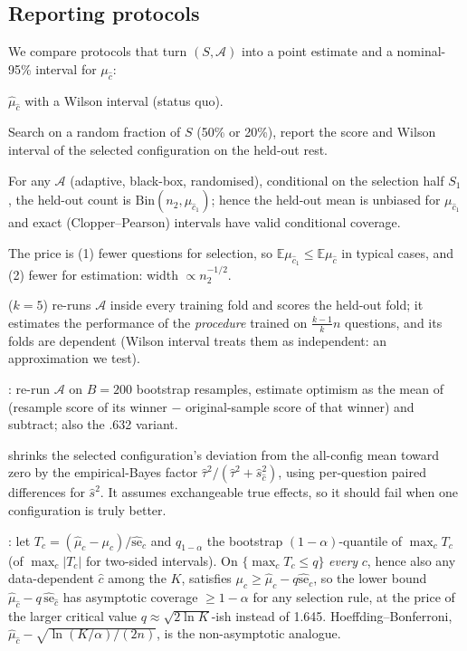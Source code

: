 \subsection{Reporting protocols}\label{sec:protocols}
We compare protocols that turn $(S,\mathcal A)$ into a point estimate and a nominal-95\% interval for $\mu_{\hat c}$:
\begin{description}[leftmargin=1.2em,itemsep=0pt,topsep=2pt]
\item[Naive] $\hat\mu_{\hat c}$ with a Wilson interval (status quo).
\item[Split ($\rho_{\rm sel}$)] Search on a random fraction of $S$ (50\% or 20\%), report the score and Wilson interval of the selected configuration on the held-out rest.
\begin{proposition}\label{prop:split}For any $\mathcal A$ (adaptive, black-box, randomised), conditional on the selection half $S_1$, the held-out count is $\mathrm{Bin}(n_2,\mu_{\hat c_1})$; hence the held-out mean is unbiased for $\mu_{\hat c_1}$ and exact (Clopper--Pearson) intervals have valid conditional coverage.\end{proposition}
The price is (1) fewer questions for selection, so $\mathbb E\mu_{\hat c_1}\le\mathbb E\mu_{\hat c}$ in typical cases, and (2) fewer for estimation: width $\propto n_2^{-1/2}$.
\item[Nested $k$-fold CV] ($k=5$) re-runs $\mathcal A$ inside every training fold and scores the held-out fold; it estimates the performance of the \emph{procedure} trained on $\tfrac{k-1}{k}n$ questions, and its folds are dependent (Wilson interval treats them as independent: an approximation we test).
\item[Bootstrap optimism] \citep{efron1997improvements}: re-run $\mathcal A$ on $B{=}200$ bootstrap resamples, estimate optimism as the mean of (resample score of its winner $-$ original-sample score of that winner) and subtract; also the .632 variant.
\item[Paired EB shrinkage] shrinks the selected configuration's deviation from the all-config mean toward zero by the empirical-Bayes factor $\hat\tau^2/(\hat\tau^2+\hat s^2_{\hat c})$, using per-question paired differences for $\hat s^2$. It assumes exchangeable true effects, so it should fail when one configuration is truly better.
\item[Max-$T$ simultaneous bound] \citep[cf.][]{chernozhukov2013gaussian,berk2013valid}: let $T_c=(\hat\mu_c-\mu_c)/\widehat{\mathrm{se}}_c$ and $q_{1-\alpha}$ the bootstrap $(1-\alpha)$-quantile of $\max_cT_c$ (of $\max_c|T_c|$ for two-sided intervals). On $\{\max_cT_c\le q\}$ \emph{every} $c$, hence also any data-dependent $\hat c$ among the $K$, satisfies $\mu_c\ge\hat\mu_c-q\widehat{\mathrm{se}}_c$, so the lower bound $\hat\mu_{\hat c}-q\,\widehat{\mathrm{se}}_{\hat c}$ has asymptotic coverage $\ge1-\alpha$ for any selection rule, at the price of the larger critical value $q\approx\sqrt{2\ln K}$-ish instead of 1.645. Hoeffding--Bonferroni, $\hat\mu_{\hat c}-\sqrt{\ln(K/\alpha)/(2n)}$, is the non-asymptotic analogue.
\end{description}
